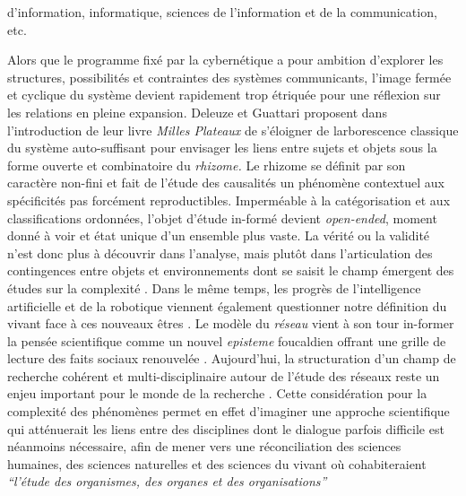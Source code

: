 d{\textquoteright}information, informatique, sciences de l{\textquoteright}information et de la communication, etc.  


Alors que le programme fixé par la cybernétique a pour ambition  d{\textquoteright}explorer les structures, possibilités et  contraintes des systèmes communicants, l{\textquoteright}image  fermée et cyclique du système devient rapidement trop étriquée  pour une réflexion sur les relations en pleine expansion. Deleuze et  Guattari proposent dans l{\textquoteright}introduction de leur livre  \textit{Milles Plateaux} \citep{Deleuze1972} de s{\textquoteright}éloigner de  l{\textquotesingle}arborescence classique du système auto-suffisant  pour envisager les liens entre sujets et objets sous la forme ouverte  et combinatoire du \textit{rhizome. }Le rhizome se définit par son  caractère non-fini et fait de l{\textquoteright}étude des  causalités un phénomène contextuel aux spécificités pas  forcément reproductibles. Imperméable à la catégorisation et  aux classifications ordonnées, l{\textquoteright}objet  d{\textquoteright}étude in-formé devient \textit{open-ended},  moment donné à voir et état unique d{\textquoteright}un ensemble  plus vaste. La vérité ou la validité n{\textquoteright}est donc  plus à découvrir dans l{\textquoteright}analyse, mais plut\^ot dans  l{\textquoteright}articulation des contingences entre objets et  environnements dont se saisit le champ émergent des études sur la  complexité \citep{Morin1990}. Dans le m\^eme temps, les progrès de  l{\textquoteright}intelligence artificielle et de la robotique viennent  également questionner notre définition du vivant face à ces  nouveaux \^etres \citep{Hofstadter1999}. Le modèle du \textit{réseau  }vient à son tour in-former la pensée scientifique comme un nouvel  \textit{episteme }foucaldien offrant une grille de lecture des faits  sociaux renouvelée \citep{Castells1989, Latour1996}.  Aujourd{\textquoteright}hui, la structuration d{\textquoteright}un  champ de recherche cohérent et multi-disciplinaire autour de  l{\textquoteright}étude des réseaux reste un enjeu important pour  le monde de la recherche \citep{Brandes2013}. Cette considération  pour la complexité des phénomènes permet en effet  d{\textquoteright}imaginer une approche scientifique qui atténuerait  les liens entre des disciplines dont le dialogue parfois difficile est  néanmoins nécessaire, afin de mener vers une réconciliation des  sciences humaines, des sciences naturelles et des sciences du vivant  o\`u cohabiteraient  \textit{{\textquotedblleft}l{\textquoteright}étude des organismes, des organes et des organisations{\textquotedblright} }\citep{Morin1990}


